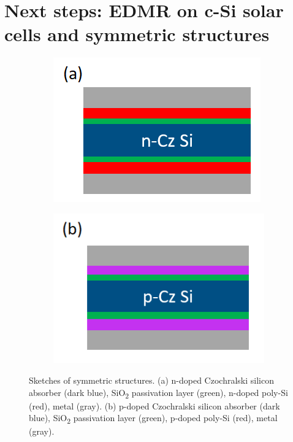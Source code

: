 \documentclass[a4paper]{book}
\newcommand{\tsub}{\textsubscript}
\begin{document}
	
	\section{Next steps: EDMR on c-Si solar cells and symmetric structures}
	\begin{figure}
		\centering
		\begin{subfigure}{.3\textwidth}
			\centering
			\includegraphics[width=\textwidth]{images/symmetric_structure_n.png}
		\end{subfigure}%
		\hspace{.1\textwidth}
		\begin{subfigure}{.32\textwidth}
			\centering
			\includegraphics[width=.95\textwidth]{images/symmetric_structure_p.png}
		\end{subfigure}
		\caption{Sketches of symmetric structures. (a) n-doped Czochralski silicon absorber (dark blue), SiO\tsub 2 passivation layer (green), n-doped poly-Si (red), metal (gray). (b) p-doped Czochralski silicon absorber (dark blue), SiO\tsub 2 passivation layer (green), p-doped poly-Si (red), metal (gray).}
		\label{fig:4_symmetric_structures}
	\end{figure}
\end{document}
